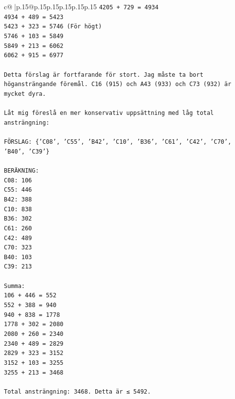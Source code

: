 \documentclass{article}
\begin{document}
{\begin{supertabular}{c@{$\;$}|p{.15\linewidth}@{}p{.15\linewidth}p{.15\linewidth}p{.15\linewidth}p{.15\linewidth}p{.15\linewidth}}
{{{\texttt{4205 + 729 = 4934} \\
\texttt{4934 + 489 = 5423} \\
\texttt{5423 + 323 = 5746 (För högt)} \\
\texttt{5746 + 103 = 5849} \\
\texttt{5849 + 213 = 6062} \\
\texttt{6062 + 915 = 6977} \\
\\ 
\texttt{Detta förslag är fortfarande för stort. Jag måste ta bort högansträngande föremål. C16 (915) och A43 (933) och C73 (932) är mycket dyra.} \\
\\ 
\texttt{Låt mig föreslå en mer konservativ uppsättning med låg total ansträngning:} \\
\\ 
\texttt{FÖRSLAG: \{'C08', 'C55', 'B42', 'C10', 'B36', 'C61', 'C42', 'C70', 'B40', 'C39'\}} \\
\\ 
\texttt{BERÄKNING:} \\
\texttt{C08: 106} \\
\texttt{C55: 446} \\
\texttt{B42: 388} \\
\texttt{C10: 838} \\
\texttt{B36: 302} \\
\texttt{C61: 260} \\
\texttt{C42: 489} \\
\texttt{C70: 323} \\
\texttt{B40: 103} \\
\texttt{C39: 213} \\
\\ 
\texttt{Summa:} \\
\texttt{106 + 446 = 552} \\
\texttt{552 + 388 = 940} \\
\texttt{940 + 838 = 1778} \\
\texttt{1778 + 302 = 2080} \\
\texttt{2080 + 260 = 2340} \\
\texttt{2340 + 489 = 2829} \\
\texttt{2829 + 323 = 3152} \\
\texttt{3152 + 103 = 3255} \\
\texttt{3255 + 213 = 3468} \\
\\ 
\texttt{Total ansträngning: 3468. Detta är ≤ 5492.} \\
            }
        }
    }
     \\ \\


\end{supertabular}}
\end{document}
